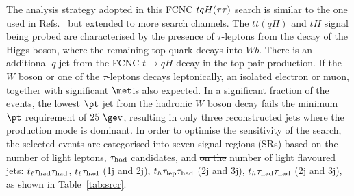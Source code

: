 \documentclass[PAPER, coverpage, atlasdraft=true, texlive=2016, UKenglish]{\ATLASLATEXPATH atlasdoc}
\providecommand{\DIFadd}[1]{{\protect\color{blue}\uwave{#1}}} %
\providecommand{\DIFdel}[1]{{\protect\color{red}\sout{#1}}}                      %
\providecommand{\DIFaddbegin}{} %
\providecommand{\DIFaddend}{} %
\providecommand{\DIFdelbegin}{} %
\providecommand{\DIFdelend}{} %
\begin{document}
The analysis strategy adopted in this FCNC $tqH(\tau\tau)$ search is similar to the one used in Refs.~\cite{fcnc36,Chen:2015nta} but extended to more search channels.
The $tt(qH)$ and $tH$ signal being probed are characterised by the presence of $\tau$-leptons from the decay of 
the Higgs boson, where the remaining top quark decays into $Wb$. There is an additional $q$-jet from the FCNC $t\to qH$ decay in the top pair production. 
If the $W$ boson or one of the $\tau$-leptons decays leptonically, an isolated electron or muon, together with significant $\met$\DIFaddbegin \DIFadd{, }\DIFaddend is also expected.
In a significant fraction of the events, the lowest $\pt$ jet from the hadronic $W$ boson decay fails the minimum $\pt$ requirement of $25~\gev$,
resulting in only three reconstructed jets where the production mode is dominant. 
In order to optimise the sensitivity of the search, the selected events are categorised into seven signal regions (SRs) based on the  number of light leptons,
$\tau_{\mathrm{had}}$ candidates, and \DIFdelbegin \DIFdel{on the }\DIFdelend number of light flavoured jets:
$t_{\ell}\tau_{\mathrm{had}} \tau_{\mathrm{had}}$, $t_{\ell}\tau_{\mathrm{had}}$ (1j and 2j), $t_h\tau_{\mathrm{lep}} \tau_{\mathrm{had}}$ (2j and 3j), $t_h\tau_{\mathrm{had}} \tau_{\mathrm{had}}$ (2j and 3j), as shown in Table~\ref{tab:srcr}. 
\end{document}
